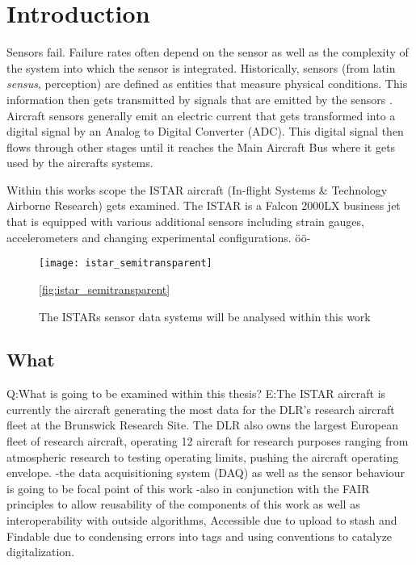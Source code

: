 \chapter{Introduction \label{ch1-intro}}

Sensors fail. Failure rates often depend on the sensor as well as the complexity of the system into which the sensor is integrated. Historically, sensors (from latin \textit{sensus}, perception) are defined as entities that measure physical conditions. This information then gets transmitted by signals that are emitted by the sensors \cite{pena-consuegra_manufacturing_2023}. Aircraft sensors generally emit an electric current that gets transformed into a digital signal by an Analog to Digital Converter (ADC). This digital signal then flows through other stages until it reaches the Main Aircraft Bus where it gets used by the aircrafts systems.

Within this works scope the ISTAR aircraft (In-flight Systems & Technology Airborne Research) gets examined. The ISTAR is a Falcon 2000LX business jet that is equipped with various additional sensors including strain gauges, accelerometers and changing experimental configurations. öö-

\begin{figure}
    \centering
    \texttt{[image: istar\_semitransparent]}
    \caption{The ISTARs sensor data systems will be analysed within this work \cite{dlr_dlr-forschungsflugzeug_2020}}
    \ref{fig:istar_semitransparent}
\end{figure}


\section{What}
Q:What is going to be examined within this thesis?
E:The ISTAR aircraft is currently the aircraft generating the most data for the DLR's research aircraft fleet at the Brunswick Research Site. The DLR also owns the largest European fleet of research aircraft, operating 12 aircraft for research purposes ranging from atmospheric research to testing operating limits, pushing the aircraft operating envelope.
-the data acquisitioning system (DAQ) as well as the sensor behaviour is going to be focal point of this work
-also in conjunction with the FAIR principles to allow reusability of the components of this work as well as interoperability with outside algorithms, Accessible due to upload to stash and Findable due to condensing errors into tags and using conventions to catalyze digitalization.

